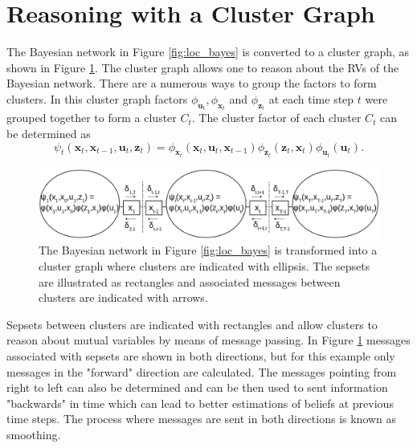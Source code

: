 \documentclass[12pt,oneside,openany,a4paper, %
afrikaans,english,
]{memoir}
\numberwithin{equation}{chapter}
\begin{document}
{\section{Reasoning with a Cluster Graph}\label{sec:cluster}
The Bayesian network in Figure \ref{fig:loc_bayes} is converted to a cluster graph, as shown in Figure \ref{fig:loc_cluster}. The cluster graph allows one to reason about the RVs of the Bayesian network. There are a numerous ways to group the factors to form clusters. In this cluster graph factors $\phi_{\bm{u}_t}, \phi_{\bm{x}_t}$ and $\phi_{\bm{z}_t}$  at each time step $t$  were grouped together to form a cluster $C_t$. The cluster factor of each cluster $C_t$ can be determined as
\begin{equation}
\psi_t(\bm{x}_t, \bm{x}_{t-1}, \bm{u}_t, \bm{z}_t) = \phi_{\bm{x}_t}(\bm{x}_t,\bm{u}_t,\bm{x}_{t-1})\phi_{\bm{z}_t}(\bm{z}_t,\bm{x}_t)\phi_{\bm{u}_t}(\bm{u}_t).
\end{equation}

\begin{figure}
  \includegraphics[width=\linewidth]{Figures/loc_clustergraph.png}
  \centering
  \caption[Cluster graph with grouped factors and sepsets]{The Bayesian network in Figure \ref{fig:loc_bayes} is transformed into a cluster graph where clusters are indicated with ellipsis. The sepsets are illustrated as rectangles and associated messages between clusters are indicated with arrows.}
  \label{fig:loc_cluster}
\end{figure}
Sepsets between clusters are indicated with rectangles and allow clusters to reason about mutual variables by means of message passing. In Figure \ref{fig:loc_cluster} messages associated with sepsets are shown in both directions, but for this example only messages in the "forward" direction are calculated. The messages pointing from right to left can also be determined and can be then used to sent information "backwards" in time which can lead to better estimations of beliefs at previous time steps. The process where messages are sent in both directions is known as smoothing.

}
\end{document}
